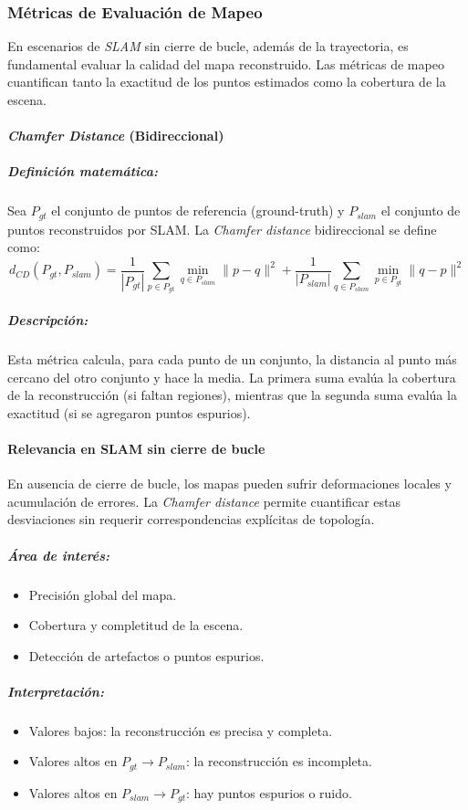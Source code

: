 \documentclass[12pt, a4paper, twoside]{article}
\begin{document}
\subsubsection{Métricas de Evaluación de Mapeo}

En escenarios de \textit{SLAM} sin cierre de bucle, además de la trayectoria, 
es fundamental evaluar la calidad del mapa reconstruido. 
Las métricas de mapeo cuantifican tanto la exactitud de los puntos estimados 
como la cobertura de la escena.

\paragraph{\textit{Chamfer Distance} (Bidireccional)}

\subparagraph{Definición matemática:}
Sea $P_{gt}$ el conjunto de puntos de referencia (ground-truth) 
y $P_{slam}$ el conjunto de puntos reconstruidos por SLAM. 
La \textit{Chamfer distance} bidireccional se define como:
\[
d_{CD}(P_{gt}, P_{slam}) = \frac{1}{|P_{gt}|} \sum_{p \in P_{gt}} 
\min_{q \in P_{slam}} \|p - q\|^2
+
\frac{1}{|P_{slam}|} \sum_{q \in P_{slam}} 
\min_{p \in P_{gt}} \|q - p\|^2
\]
\subparagraph{Descripción:}
Esta métrica calcula, para cada punto de un conjunto, la distancia al punto más cercano del otro conjunto y 
hace la media. La primera suma evalúa la cobertura de la reconstrucción (si faltan regiones), mientras que la 
segunda suma evalúa la exactitud (si se agregaron puntos espurios).

\paragraph{Relevancia en SLAM sin cierre de bucle}
En ausencia de cierre de bucle, los mapas pueden sufrir deformaciones locales y acumulación de errores. 
La \textit{Chamfer distance} permite cuantificar estas desviaciones sin requerir correspondencias explícitas de topología.

\subparagraph{Área de interés:}
\begin{itemize}
  \item Precisión global del mapa.
  \item Cobertura y completitud de la escena.
  \item Detección de artefactos o puntos espurios.
\end{itemize}

\subparagraph{Interpretación:}
\begin{itemize}
  \item Valores bajos: la reconstrucción es precisa y completa.  
  \item Valores altos en $P_{gt} \to P_{slam}$: la reconstrucción es incompleta.
  \item Valores altos en $P_{slam} \to P_{gt}$: hay puntos espurios o ruido.
\end{itemize}
\end{document}
